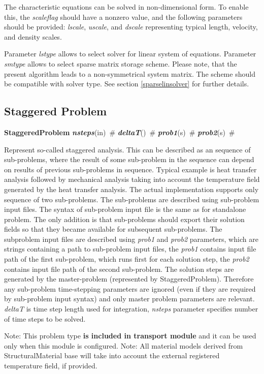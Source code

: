 \documentclass[draft]{article}
\newcommand{\param}[1]{{\em #1}}
\newcommand{\keywordnotype}[1]{\mbox{{\it{\bf{#1}}}}}
\newcommand{\keyword}[2]{\mbox{{\keywordnotype{#1}\tiny (#2)}}}
\newcommand{\entKeywordInst}[1]{\mbox{{\bf{{#1}}}}}
\newcommand{\field}[2]{\mbox{\keyword{#1}{#2}~\#}}
\begin{document}
The characteristic equations can be solved in non-dimensional form. To
enable this, the \param{scaleflag} should have a nonzero value,
and the following parameters should be provided: \param{lscale},
\param{uscale}, and \param{dscale} representing typical length,
velocity, and density scales. 

Parameter \param{lstype} allows to select solver for linear system of
equations. Parameter \param{smtype} allows to select sparse matrix storage
scheme. Please note, that the present algorithm leads to a
non-symmetrical system
matrix. The scheme should be compatible with solver type. See section
\ref{sparselinsolver} for further details.

\subsection{Staggered Problem}
\label{staggeredproblem}
\entKeywordInst{StaggeredProblem} \field{nsteps}{in}
\field{deltaT}{} \field{prob1}{s} \field{prob2}{s} 

Represent so-called staggered analysis. This can be described as an
sequence of sub-problems, where the result of some sub-problem in the
sequence can depend on results of previous sub-problems in sequence.
Typical example is heat transfer analysis followed by mechanical
analysis taking into account the temperature field generated by the
heat transfer analysis.
The actual implementation supports only sequence of two sub-problems.
The sub-problems are described using sub-problem input files. The
syntax of sub-problem input file is the same as for standalone
problem. The only addition is that sub-problems should export their
solution fields so that they became available for subsequent
sub-problems. The subproblem input files are described using
\param{prob1} and \param{prob2} parameters, which are strings
containing a path to sub-problem input files, the \param{prob1}
contains input file path of the first sub-problem, which runs first
for each solution step, the \param{prob2} contains input file path of
the second sub-problem. The solution steps are generated by the
master-problem (represented by StaggeredProblem). Therefore any
sub-problem time-stepping parameters are ignored (even if they are
required by sub-problem input syntax) and only master problem
parameters are relevant. \param{deltaT} is time step length used for
integration, \param{nsteps} parameter specifies
number of time steps to be solved.

Note: This problem type {\bf is included in transport module} and it
can be used only when this module is configured.
Note: All material models derived from StructuralMaterial base will
take into account the external registered temperature field, if
provided.
\end{document}
